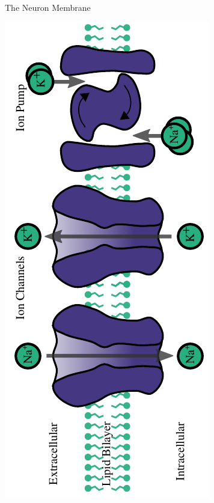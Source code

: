 \documentclass[aspectratio=169]{beamer}
\begin{document}
% 
\begin{frame}{The Neuron Membrane}
    \begin{center}
        \includegraphics[angle=-90,width=\textwidth]{images/ion_pumps_0.pdf}
    \end{center}
\end{frame}
\end{document}
